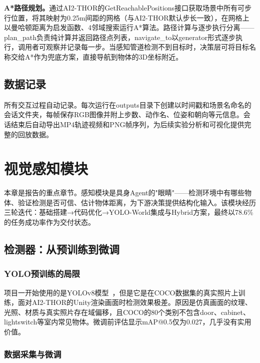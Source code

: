\documentclass{SYSUReport}
\begin{document}
\textbf{A*路径规划。}通过AI2-THOR的GetReachablePositions接口获取场景中所有可步行位置，将其映射为0.25m间距的网格（与AI2-THOR默认步长一致），在网格上以曼哈顿距离为启发函数、4邻域搜索运行A*算法。路径计算与逐步执行分离——plan\_path负责纯计算并返回路径点列表，navigate\_to以generator形式逐步执行，调用者可观察并记录每一步。当感知管道检测不到目标时，决策层可将目标名称交给A*作为兜底方案，直接导航到物体的3D坐标附近。

\subsection{数据记录}

所有交互过程自动记录。每次运行在outputs目录下创建以时间戳和场景名命名的会话文件夹，每帧保存RGB图像并附上步数、动作名、位姿和朝向等元信息。会话结束后自动导出MP4轨迹视频和PNG帧序列，为后续实验分析和可视化提供完整的回放数据。

\section{视觉感知模块}

本章是报告的重点章节。感知模块是具身Agent的"眼睛"——检测环境中有哪些物体、验证检测是否可信、估计物体距离，为下游决策提供结构化输入。该模块经历三轮迭代：基础搭建→代码优化→YOLO-World集成与Hybrid方案，最终以78.6\%的任务成功率作为交付状态。

\subsection{检测器：从预训练到微调}

\subsubsection{YOLO预训练的局限}

项目一开始使用的是YOLOv8模型~\cite{jocher2023ultralytics}，但是它是在COCO数据集的真实照片上训练，面对AI2-THOR的Unity渲染画面时检测效果极差。原因是仿真画面的纹理、光照、材质与真实照片存在域偏移，且COCO的80个类别不包含door、cabinet、lightswitch等室内常见物体。微调前评估显示mAP@0.5仅为0.027，几乎没有实用价值。

\subsubsection{数据采集与微调}
\end{document}
